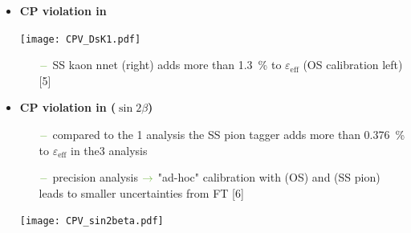 {\begin{minipage}{0.474\boxwidth}
\begin{itemize}
\item\textbf{CP violation in \BsToDsK}

\vspace{-1.7em}
\begin{flushleft}
\texttt{[image: CPV\_DsK1.pdf]}
\end{flushleft}
\vspace{-2.5em}

	\begin{itemize}
	\setlength\itemsep{0.01em}
	\setlength{\itemindent}{-.11in}
	\item[${\color{tu_gruen}-}$] SS kaon nnet (right) adds more than \SI{1.3}{\%} to $\varepsilon_\text{eff}$ (OS calibration left) [5]
	\end{itemize}
\end{itemize}
\end{minipage}
\vspace{0.7em}
\hfill
\begin{minipage}{0.474\boxwidth}
\vspace{-1.2em}
\begin{itemize}
\item\textbf{CP violation in \BdToJPsiKS ($\sin2\beta$)}
	\begin{itemize}
	\setlength\itemsep{0.01em}
	\setlength{\itemindent}{-.11in}
	\item[${\color{tu_gruen}-}$] compared to the \SI{1}{\invfb} analysis the SS pion tagger adds more than \SI{0.376}{\%} to $\varepsilon_\text{eff}$ in the\SI{3}{\invfb} analysis
	\item[${\color{tu_gruen}-}$] precision analysis \hspace{0.1em}${\color{tu_gruen}\rightarrow}$ "ad-hoc" calibration with \BuToJPsiKp (OS) and \BdToJPsiKst (SS pion) leads to smaller uncertainties from FT [6]
	\end{itemize}

\vspace{-1.7em}
\begin{center}
\texttt{[image: CPV\_sin2beta.pdf]}
\end{center}
\vspace{-2.5em}



\end{itemize}
\end{minipage}}
